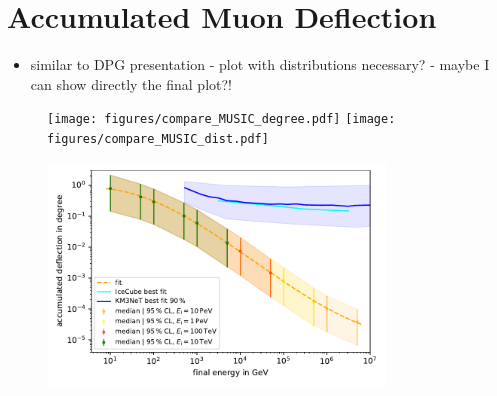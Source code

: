 \section{Accumulated Muon Deflection}\label{sec:accum_defl}
\begin{itemize}
    \item similar to DPG presentation - plot with distributions necessary? - 
        maybe I can show directly the final plot?!
\end{itemize}




\begin{figure}
    \centering
    \subcaptionbox{
        \label{fig:compare_MUSIC_degree}}
        {\texttt{[image: figures/compare\_MUSIC\_degree.pdf]}}
    \subcaptionbox{
        \label{fig:compare_MUSIC_dist}}
        {\texttt{[image: figures/compare\_MUSIC\_dist.pdf]}}
    \caption{}
    \label{fig:compare_MUSIC}
\end{figure}


\begin{figure}
    \centering 
    \includegraphics[width=0.8\textwidth]{figures/fit_median_defl_cut_10percent_only_poly.pdf}
    \caption{}
    \label{fig:fit_median}
\end{figure}
